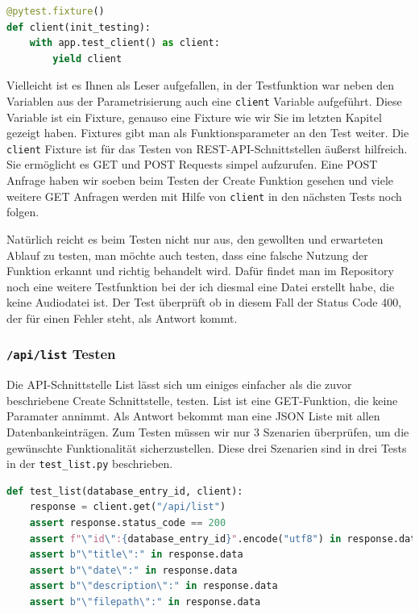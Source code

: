 \documentclass{article}
\begin{document}
\begin{lstlisting}[language=Python, caption=Implementation der \texttt{client}-Fixture]
@pytest.fixture() 
def client(init_testing): 
    with app.test_client() as client: 
        yield client 
\end{lstlisting}

Vielleicht ist es Ihnen als Leser aufgefallen, in der Testfunktion war neben den Variablen aus der Parametrisierung auch eine \texttt{client} Variable aufgeführt. Diese Variable ist ein Fixture, genauso eine Fixture wie wir Sie im letzten Kapitel gezeigt haben. Fixtures gibt man als Funktionsparameter an den Test weiter. Die \texttt{client} Fixture ist für das Testen von REST-API-Schnittstellen äußerst hilfreich. Sie ermöglicht es GET und POST Requests simpel aufzurufen. Eine POST Anfrage haben wir soeben beim Testen der Create Funktion gesehen und viele weitere GET Anfragen werden mit Hilfe von \texttt{client} in den nächsten Tests noch folgen. 

Natürlich reicht es beim Testen nicht nur aus, den gewollten und erwarteten Ablauf zu testen, man möchte auch testen, dass eine falsche Nutzung der Funktion erkannt und richtig behandelt wird. Dafür findet man im Repository noch eine weitere Testfunktion bei der ich diesmal eine Datei erstellt habe, die keine Audiodatei ist. Der Test überprüft ob in diesem Fall der Status Code 400, der für einen Fehler steht, als Antwort kommt. 

\subsubsection{\texttt{/api/list} Testen}
Die API-Schnittstelle List lässt sich um einiges einfacher als die zuvor beschriebene Create Schnittstelle, testen. List ist eine GET-Funktion, die keine Paramater annimmt. Als Antwort bekommt man eine JSON Liste mit allen Datenbankeinträgen. Zum Testen müssen wir nur 3 Szenarien überprüfen, um die gewünschte Funktionalität sicherzustellen. Diese drei Szenarien sind in drei Tests in der \texttt{test\_list.py} beschrieben.  

\begin{lstlisting}[language=Python, caption=Test-Implementation von \texttt{/api/list}]
def test_list(database_entry_id, client): 
    response = client.get("/api/list") 
    assert response.status_code == 200 
    assert f"\"id\":{database_entry_id}".encode("utf8") in response.data 
    assert b"\"title\":" in response.data 
    assert b"\"date\":" in response.data 
    assert b"\"description\":" in response.data 
    assert b"\"filepath\":" in response.data 
\end{lstlisting}
\end{document}
